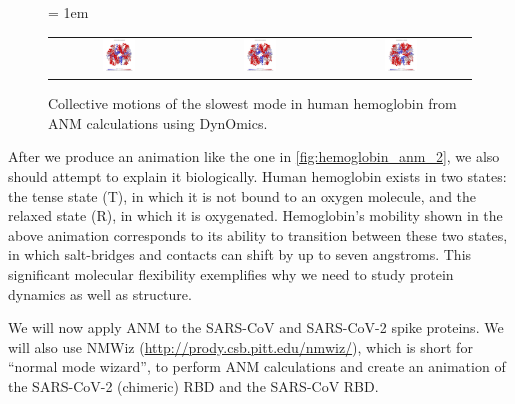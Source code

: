 \begin{figure}[h]
	\centering
	\tabcolsep = 1em
	\mySfFamily
	\begin{tabular}{c c c}
		\includegraphics[width = 0.25\textwidth]{../images/hemoglobin_animation1.png} & \includegraphics[width = 0.25\textwidth]{../images/hemoglobin_animation2.png} & \includegraphics[width = 0.25\textwidth]{../images/hemoglobin_animation3.png}
	\end{tabular}
	\caption{Collective motions of the slowest mode in human hemoglobin from ANM calculations using DynOmics.}
	\label{fig:hemoglobin_anm_2}
\end{figure}


After we produce an animation like the one in \autoref{fig:hemoglobin_anm_2}, we also should attempt to explain it biologically. Human hemoglobin exists in two states: the tense state (T), in which it is not bound to an oxygen molecule, and the relaxed state (R), in which it is oxygenated. Hemoglobin's mobility shown in the above animation corresponds to its ability to transition between these two states, in which salt-bridges and contacts can shift by up to seven angstroms. This significant molecular flexibility exemplifies why we need to study protein dynamics as well as structure.

We will now apply ANM to the SARS-CoV and SARS-CoV-2 spike proteins. We will also use NMWiz (\url{http://prody.csb.pitt.edu/nmwiz/}), which is short for ``normal mode wizard'', to perform ANM calculations and create an animation of the SARS-CoV-2 (chimeric) RBD and the SARS-CoV RBD. 

